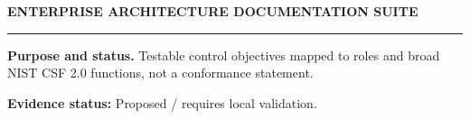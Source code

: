 \documentclass[10pt,letterpaper]{article}
\begin{document}
\begin{center}
{\large\bfseries\color{teal} ENTERPRISE ARCHITECTURE DOCUMENTATION SUITE}\par
{}\par
{}\par
\end{center}
\vspace{8pt}\hrule\vspace{12pt}
\textbf{Purpose and status.} Testable control objectives mapped to roles and broad NIST CSF 2.0 functions, not a conformance statement.\par
\textbf{Evidence status:} Proposed / requires local validation.\par
\end{document}
